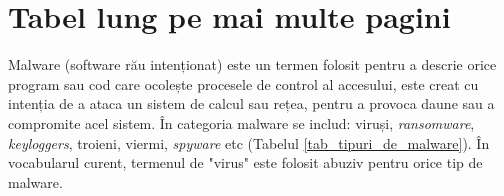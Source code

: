 \newpage
\section{Tabel lung pe mai multe pagini}
\label{anexa4:long_table}

Malware (software rău intenționat) este un termen folosit pentru a descrie orice program sau cod care ocolește procesele de control al accesului, este creat cu intenția de a ataca un sistem de calcul sau rețea, pentru a provoca daune sau a compromite acel sistem. În categoria malware se includ: viruși, \textit{ransomware}, \textit{keyloggers}, troieni, viermi, \textit{spyware} etc (Tabelul \ref{tab_tipuri_de_malware}). În vocabularul curent, termenul de "virus" este folosit abuziv pentru orice tip de malware.

